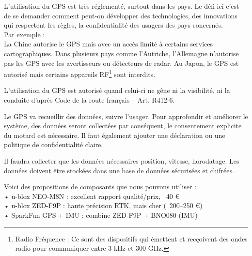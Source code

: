 L'utilisation du GPS est très réglementé, surtout dans les pays. Le défi ici c'est de se demander comment peut-on développer des technologies, des innovations qui respectent les règles, la confidentialité des usagers des pays concernés.\\

Par exemple :\\
La Chine autorise le GPS mais avec un accès limité à certains services cartographiques. Dans plusieurs pays comme l'Autriche, l'Allemagne n'autorise pas les GPS avec les avertisseurs ou détecteurs de radar. Au Japon, le GPS est autorisé mais certains appareils RF\footnote{Radio Fréquence : Ce sont des dispositifs qui émettent et recçoivent des ondes radio pour communiquer entre 3 kHz et 300 GHz.} sont interdits.


L'utilisation du GPS est autorisé quand celui-ci ne gêne ni la visibilité, ni la conduite d'après Code de la route français – Art. R412-6\cite{loi_code_de_la_route}.

Le GPS va recueillir des données, suivre l'usager. Pour approfondir et améliorer le système, des données seront collectées par conséquent, le consentement explicite du motard est nécessaire. Il faut également ajouter une déclaration ou une politique de confidentialité claire.

Il faudra collecter que les données nécessaires position, vitesse, horodatage. Les données doivent être stockées dans une base de données sécurisées et chifrées.

Voici des propositions de composants que nous pouvons utiliser : 	\\
•	u-blox NEO-M8N : excellent rapport qualité/prix, ~40 € \\
•	u-blox ZED-F9P : haute précision RTK, mais cher (~200–250 €) \\
•	SparkFun GPS + IMU : combine ZED-F9P + BNO080 (IMU)\\


